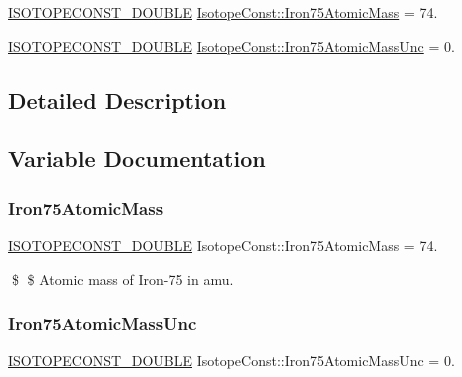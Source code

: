 \begin{DoxyCompactItemize}
\item 
\mbox{\hyperlink{group___isotope_const-_macros_ga8f45a7272ce02c0b4c65c44636ed719a}{I\+S\+O\+T\+O\+P\+E\+C\+O\+N\+S\+T\+\_\+\+D\+O\+U\+B\+LE}} \mbox{\hyperlink{group___isotope_const-_iron-_fe75_ga4291172fa1a1d47fb965778c90b91953}{Isotope\+Const\+::\+Iron75\+Atomic\+Mass}} = 74.
\item 
\mbox{\hyperlink{group___isotope_const-_macros_ga8f45a7272ce02c0b4c65c44636ed719a}{I\+S\+O\+T\+O\+P\+E\+C\+O\+N\+S\+T\+\_\+\+D\+O\+U\+B\+LE}} \mbox{\hyperlink{group___isotope_const-_iron-_fe75_gab98d8cba690981b8ca99e28fb9aa34e3}{Isotope\+Const\+::\+Iron75\+Atomic\+Mass\+Unc}} = 0.
\end{DoxyCompactItemize}


\subsection{Detailed Description}


\subsection{Variable Documentation}
\mbox{\label{group___isotope_const-_iron-_fe75_ga4291172fa1a1d47fb965778c90b91953}} 
\subsubsection{\texorpdfstring{Iron75\+Atomic\+Mass}{Iron75AtomicMass}}
{\footnotesize\ttfamily \mbox{\hyperlink{group___isotope_const-_macros_ga8f45a7272ce02c0b4c65c44636ed719a}{I\+S\+O\+T\+O\+P\+E\+C\+O\+N\+S\+T\+\_\+\+D\+O\+U\+B\+LE}} Isotope\+Const\+::\+Iron75\+Atomic\+Mass = 74.}

\$ \$ Atomic mass of Iron-\/75 in amu. \mbox{\label{group___isotope_const-_iron-_fe75_gab98d8cba690981b8ca99e28fb9aa34e3}} 
\subsubsection{\texorpdfstring{Iron75\+Atomic\+Mass\+Unc}{Iron75AtomicMassUnc}}
{\footnotesize\ttfamily \mbox{\hyperlink{group___isotope_const-_macros_ga8f45a7272ce02c0b4c65c44636ed719a}{I\+S\+O\+T\+O\+P\+E\+C\+O\+N\+S\+T\+\_\+\+D\+O\+U\+B\+LE}} Isotope\+Const\+::\+Iron75\+Atomic\+Mass\+Unc = 0.}

